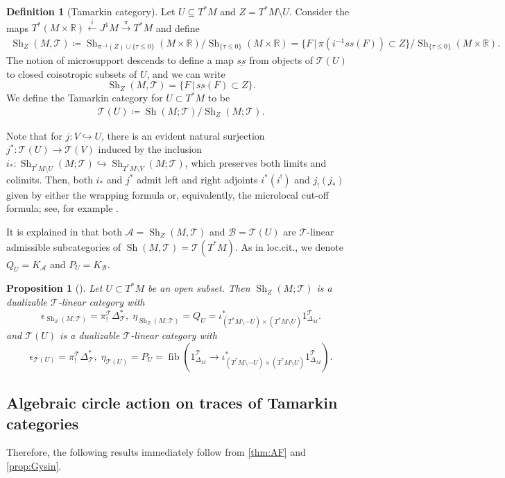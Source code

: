 \documentclass[11pt]{amsart}
\numberwithin{equation}{section}
\theoremstyle{plain}
\newtheorem{Prop}[prop]{Proposition}
\theoremstyle{definition}
\newtheorem{Def}[def]{Definition}
\theoremstyle{remark}
\newcommand{\bR} { {\mathbb{R}}}
\newcommand{\cA} { {\mathcal{A}}}
\newcommand{\cB} { {\mathcal{B}}}
\newcommand{\sT} { {\mathscr{T}}}
\newcommand{\Sh} { {\operatorname{Sh}}}
\begin{document}
\begin{Def}[Tamarkin category]
Let $U \subseteq T^*M$ and $Z = T^*M \setminus U$. Consider the maps $ T^*(M \times \bR) \xleftarrow{i} J^1 M \xrightarrow{\pi} T^*M$ and  define
\begin{align}
  \Sh_Z(M,\sT)\coloneqq \Sh_{\pi^{-1}(Z) \cup \{\tau \leq 0\}}(M \times \bR)/\Sh_{\{\tau \leq 0\}}(M \times \bR) = \{F\, |\, 
\pi(i^{-1} ss(F)) \subset Z\} /\Sh_{\{\tau \leq 0\}}(M \times \bR).
\end{align}
The notion of microsupport descends to define
a map $\underline{ss}$ from objects of $\sT(U)$ to closed coisotropic subsets of $U$, and we can write
\[\Sh_Z(M,\sT) = \{F\, |\, \underline{ss}(F) \subset Z\}.\]
We define the Tamarkin category for $U \subset T^*M$ to be
\begin{align}
\sT(U) \coloneqq \Sh(M; \sT) /\Sh_Z(M;\sT).
\end{align}
\end{Def}

Note that for
$j: V \hookrightarrow U$, there is an evident natural surjection 
$j^*: \sT(U) \to \sT(V)$
induced by the inclusion $i_*: \Sh_{T^*M \setminus U}(M; \sT) \hookrightarrow \Sh_{T^*M \setminus V}(M; \sT)$, which preserves both limits and colimits. 
Then, both $i_*$ and $j^*$ admit left and right adjoints $i^*(i^!)$ and $j_!(j_*)$ given by either the wrapping formula or, equivalently, the microlocal cut-off formula; see, for example \cite{Hochschild-Kuo-Shende-Zhang,zhang-cutoff}.

It is explained in \cite[Section 5]{Hochschild-Kuo-Shende-Zhang} that both $\cA=\Sh_Z(M,\sT)$ and $\cB=\sT(U)$ are $\sT$-linear admissible subcategories of $\Sh(M,\sT)=\sT(T^*M)$. As in loc.cit., we denote $Q_U=K_\cA$ and $P_U=K_\cB$.

\begin{Prop}[{\cite[Proposition~6.9]{Hochschild-Kuo-Shende-Zhang}}]\label{prop:unit-counit-tamarkin}
    Let $U \subset T^*M$ be an open subset. Then $\Sh_Z(M; \sT)$ is a dualizable $\sT$-linear category with
    \[\epsilon_{\Sh_Z(M; \sT)} = \pi_!^\sT \Delta_\sT^*, \; \eta_{\Sh_Z(M; \sT)} = Q_U = \iota_{(T^*M \setminus -U) \times (T^*M \setminus U)}^*1_{\Delta_M}^\sT.\]
    and $\sT(U)$ is a dualizable $\sT$-linear category with 
    \[\epsilon_{\sT(U)} = \pi_!^\sT \Delta_\sT^*, \; \eta_{\sT(U)} = P_U = \operatorname{fib}(1_{\Delta_M}^\sT \to \iota_{(T^*M \setminus -U) \times (T^*M \setminus U)}^*1_{\Delta_M}^\sT).\]
\end{Prop}

\subsection{Algebraic circle action on traces of Tamarkin categories}\label{sec:Tamarkin trace}
Therefore, the following results immediately follow from \autoref{thm:AF} and \autoref{prop:Gysin}.
\end{document}
